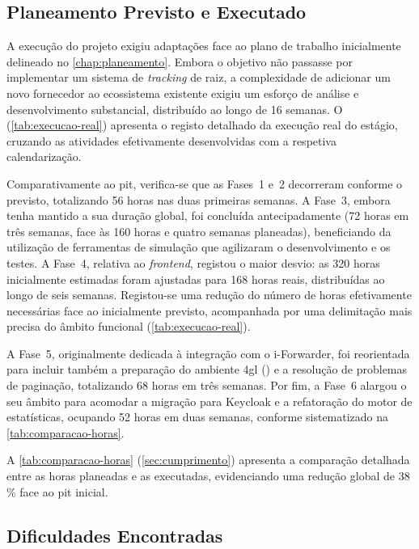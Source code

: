 \subsection{Planeamento Previsto e Executado}

A execução do projeto exigiu adaptações face ao plano de trabalho inicialmente delineado no \autoref{chap:planeamento}. Embora o objetivo não passasse por implementar um sistema de \textit{tracking} de raiz, a complexidade de adicionar um novo fornecedor ao ecossistema existente exigiu um esforço de análise e desenvolvimento substancial, distribuído ao longo de 16 semanas. O  (\autoref{tab:execucao-real}) apresenta o registo detalhado da execução real do estágio, cruzando as atividades efetivamente desenvolvidas com a respetiva calendarização.

Comparativamente ao \gls{pit}, verifica-se que as Fases~1 e~2 decorreram conforme o previsto, totalizando 56 horas nas duas primeiras semanas. A Fase~3, embora tenha mantido a sua duração global, foi concluída antecipadamente (72 horas em três semanas, face às 160 horas e quatro semanas planeadas), beneficiando da utilização de ferramentas de simulação que agilizaram o desenvolvimento e os testes. A Fase~4, relativa ao \textit{frontend}, registou o maior desvio: as 320 horas inicialmente estimadas foram ajustadas para 168 horas reais, distribuídas ao longo de seis semanas. Registou-se uma redução do número de horas efetivamente necessárias face ao inicialmente previsto, acompanhada por uma delimitação mais precisa do âmbito funcional (\autoref{tab:execucao-real}).

A Fase~5, originalmente dedicada à integração com o i-Forwarder, foi reorientada para incluir também a preparação do ambiente \gls{4gl} () e a resolução de problemas de paginação, totalizando 68 horas em três semanas. Por fim, a Fase~6 alargou o seu âmbito para acomodar a migração para Keycloak e a refatoração do motor de estatísticas, ocupando 52 horas em duas semanas, conforme sistematizado na \autoref{tab:comparacao-horas}.

A \autoref{tab:comparacao-horas} (\autoref{sec:cumprimento}) apresenta a comparação detalhada entre as horas planeadas e as executadas, evidenciando uma redução global de 38\,\% face ao \gls{pit} inicial.

\subsection{Dificuldades Encontradas}

